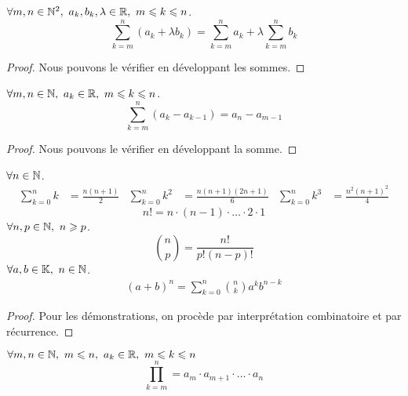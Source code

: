 \begin{proposition}
    $\forall m, n \in \mathbb{N}^2,\ a_k, b_k, \lambda \in \mathbb{R},\ m \leqslant k \leqslant n$.
    \[ \sum_{k = m}^{n} (a_k + \lambda b_k) = \sum_{k = m}^n a_k + \lambda \sum_{k = m}^n b_k \]
\end{proposition}

\begin{proof}
	Nous pouvons le vérifier en développant les sommes.
\end{proof}

\begin{proposition}
    $\forall m, n \in \mathbb{N},\ a_k \in \mathbb{R},\ m \leqslant k \leqslant n$.
    \[ \sum_{k = m}^n (a_k - a_{k - 1}) = a_n - a_{m - 1} \]
\end{proposition}

\begin{proof}
	Nous pouvons le vérifier en développant la somme.
\end{proof}

\begin{proposition}
	$\forall n \in \mathbb{N}$.
	\begin{align*}
		\sum_{k = 0}^{n} k &= \frac{n(n+1)}{2} & 
		\sum_{k = 0}^{n} k^2 &= \frac{n(n+1)(2n+1)}{6} &
		\sum_{k = 0}^{n} k^3 &= \frac{n^2(n+1)^2}{4}
	\end{align*}
	\[ n! = n \cdot (n - 1) \cdot \ldots \cdot 2 \cdot 1 \]
	$\forall n, p \in \mathbb{N},\ n \geqslant p$.
	\[ \binom{n}{p} = \frac{n!}{p!(n - p)!} \]
	$\forall a, b \in \mathbb{K},\ n \in \mathbb{N}$.
	\begin{align*}
		(a + b)^n = \sum_{k = 0}^{n} \binom{n}{k} a^kb^{n-k}
	\end{align*}
\end{proposition}
\begin{proof}
    Pour les démonstrations, on procède par interprétation combinatoire et par récurrence.
\end{proof}

\begin{definition}[Produit]
    $\forall m, n \in \mathbb{N},\ m \leqslant n,\ a_k \in \mathbb{R},\ m \leqslant k \leqslant n$
    \[ \prod_{k = m}^{n} = a_m \cdot a_{m+1} \cdot \ldots \cdot a_n \]
\end{definition}